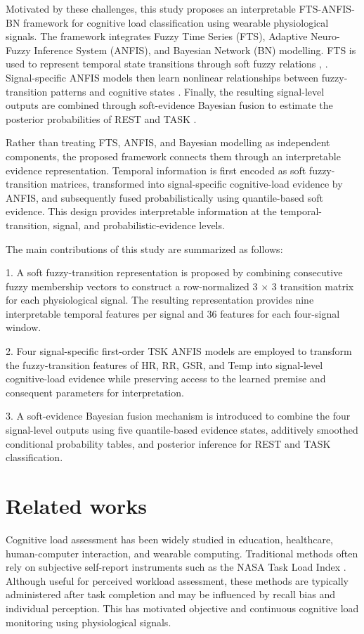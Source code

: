 \documentclass[runningheads]{llncs}
\begin{document}
Motivated by these challenges, this study proposes an interpretable FTS-ANFIS-BN framework for cognitive load classification using wearable physiological signals. The framework integrates Fuzzy Time Series (FTS), Adaptive Neuro-Fuzzy Inference System (ANFIS), and Bayesian Network (BN) modelling. FTS is used to represent temporal state transitions through soft fuzzy relations \cite{ref5}, \cite{ref6}. Signal-specific ANFIS models then learn nonlinear relationships between fuzzy-transition patterns and cognitive states \cite{ref7}. Finally, the resulting signal-level outputs are combined through soft-evidence Bayesian fusion to estimate the posterior probabilities of REST and TASK \cite{ref8}.

Rather than treating FTS, ANFIS, and Bayesian modelling as independent components, the proposed framework connects them through an interpretable evidence representation. Temporal information is first encoded as soft fuzzy-transition matrices, transformed into signal-specific cognitive-load evidence by ANFIS, and subsequently fused probabilistically using quantile-based soft evidence. This design provides interpretable information at the temporal-transition, signal, and probabilistic-evidence levels.

The main contributions of this study are summarized as follows:

1. A soft fuzzy-transition representation is proposed by combining consecutive fuzzy membership vectors to construct a row-normalized 3 $\times$ 3 transition matrix for each physiological signal. The resulting representation provides nine interpretable temporal features per signal and 36 features for each four-signal window.

2. Four signal-specific first-order TSK ANFIS models are employed to transform the fuzzy-transition features of HR, RR, GSR, and Temp into signal-level cognitive-load evidence while preserving access to the learned premise and consequent parameters for interpretation.

3. A soft-evidence Bayesian fusion mechanism is introduced to combine the four signal-level outputs using five quantile-based evidence states, additively smoothed conditional probability tables, and posterior inference for REST and TASK classification.

\section{Related works}

Cognitive load assessment has been widely studied in education, healthcare, human-computer interaction, and wearable computing. Traditional methods often rely on subjective self-report instruments such as the NASA Task Load Index \cite{ref4}. Although useful for perceived workload assessment, these methods are typically administered after task completion and may be influenced by recall bias and individual perception. This has motivated objective and continuous cognitive load monitoring using physiological signals.
\end{document}
